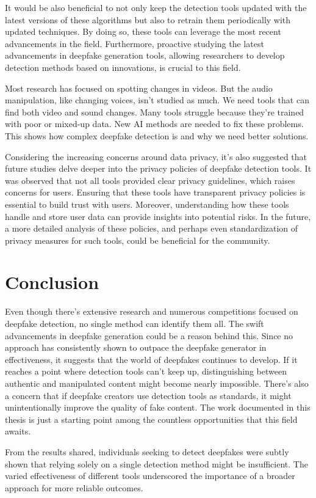 It would be also beneficial to not only keep the
detection tools updated with the latest versions of these algorithms but also to
retrain them periodically with updated techniques. By doing so, these tools can
leverage the most recent advancements in the field. Furthermore, proactive studying the
latest advancements in deepfake generation tools, allowing researchers to develop detection
methods based on innovations, is crucial to this field.

Most research has focused on spotting changes in videos. But the audio manipulation,
like changing voices, isn't studied as much. We need tools that can find both video
and sound changes. Many tools struggle because they're trained with poor or mixed-up
data. New \ac{AI} methods are needed to fix these problems. This shows how complex
deepfake detection is and why we need better solutions.

Considering the increasing concerns around data privacy, it's also suggested that future
studies delve deeper into the privacy policies of deepfake detection tools. It was
observed that not all tools provided clear privacy guidelines, which raises concerns
for users. Ensuring that these tools have transparent privacy policies is essential to
build trust with users. Moreover, understanding how these tools handle and store
user data can provide insights into potential risks. In the future, a more detailed
analysis of these policies, and perhaps even standardization of privacy measures
for such tools, could be beneficial for the community.

\section{Conclusion}
Even though there's extensive research and numerous competitions focused on deepfake
detection, no single method can identify them all. The swift advancements in
deepfake generation could be a reason behind this. Since no approach has consistently
shown to outpace the deepfake generator in effectiveness, it suggests that the world
of deepfakes continues to develop. If it reaches a point where detection tools can't
keep up, distinguishing between authentic and manipulated content might become
nearly impossible. There's also a concern that if deepfake creators use detection
tools as standards, it might unintentionally improve the quality of fake content.
The work documented in this thesis is just a starting point among the countless
opportunities that this field awaits.


From the results shared, individuals seeking to detect deepfakes were subtly shown
that relying solely on a single detection method might be insufficient. The varied
effectiveness of different tools underscored the importance of a broader approach
for more reliable outcomes.
